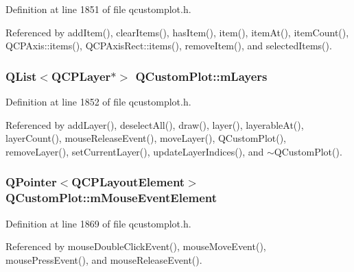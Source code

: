 Definition at line 1851 of file qcustomplot.\+h.



Referenced by add\+Item(), clear\+Items(), has\+Item(), item(), item\+At(), item\+Count(), Q\+C\+P\+Axis\+::items(), Q\+C\+P\+Axis\+Rect\+::items(), remove\+Item(), and selected\+Items().

\hypertarget{class_q_custom_plot_a72ee313041b873d76c198793ce7e6c37}{}
\subsubsection[{m\+Layers}]{\setlength{\rightskip}{0pt plus 5cm}Q\+List$<${\bf Q\+C\+P\+Layer}$\ast$$>$ Q\+Custom\+Plot\+::m\+Layers\hspace{0.3cm}{\ttfamily [protected]}}\label{class_q_custom_plot_a72ee313041b873d76c198793ce7e6c37}


Definition at line 1852 of file qcustomplot.\+h.



Referenced by add\+Layer(), deselect\+All(), draw(), layer(), layerable\+At(), layer\+Count(), mouse\+Release\+Event(), move\+Layer(), Q\+Custom\+Plot(), remove\+Layer(), set\+Current\+Layer(), update\+Layer\+Indices(), and $\sim$\+Q\+Custom\+Plot().

\hypertarget{class_q_custom_plot_a2f2e8b25e59cf3cf7b15e4767c02e747}{}
\subsubsection[{m\+Mouse\+Event\+Element}]{\setlength{\rightskip}{0pt plus 5cm}Q\+Pointer$<${\bf Q\+C\+P\+Layout\+Element}$>$ Q\+Custom\+Plot\+::m\+Mouse\+Event\+Element\hspace{0.3cm}{\ttfamily [protected]}}\label{class_q_custom_plot_a2f2e8b25e59cf3cf7b15e4767c02e747}


Definition at line 1869 of file qcustomplot.\+h.



Referenced by mouse\+Double\+Click\+Event(), mouse\+Move\+Event(), mouse\+Press\+Event(), and mouse\+Release\+Event().

\hypertarget{class_q_custom_plot_ac57090da95056ae4dd67be67adfa85bd}{}
